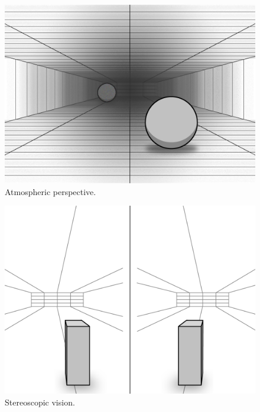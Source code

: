 \begin{figure}[H]
	\centering
	\includegraphics[width=1\linewidth]{figure/Analysis/atmosphericPerspective.png}
	\caption{Atmospheric perspective.}
	\label{fig:atmosphericPerspective}
\end{figure}

\begin{figure}[H]
	\centering
	\includegraphics[width=1\linewidth]{figure/Analysis/stereoScopicVision.png}
	\caption{Stereoscopic vision.}
	\label{fig:stereoscopicVision}
\end{figure}
